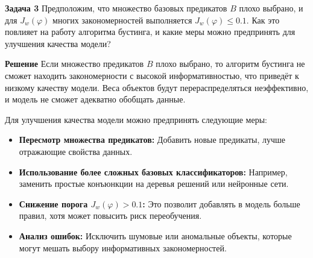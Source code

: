 \vspace{0.5cm}

\textbf{Задача 3}  
Предположим, что множество базовых предикатов \( B \) плохо выбрано, и для \( J_w(\varphi) \) многих закономерностей выполняется \( J_w(\varphi) \leq 0.1 \). Как это повлияет на работу алгоритма бустинга, и какие меры можно предпринять для улучшения качества модели?  

\textbf{Решение}  
Если множество предикатов \( B \) плохо выбрано, то алгоритм бустинга не сможет находить закономерности с высокой информативностью, что приведёт к низкому качеству модели. Веса объектов будут перераспределяться неэффективно, и модель не сможет адекватно обобщать данные.  

Для улучшения качества модели можно предпринять следующие меры:
\begin{itemize}
    \item \textbf{Пересмотр множества предикатов:} Добавить новые предикаты, лучше отражающие свойства данных.  
    \item \textbf{Использование более сложных базовых классификаторов:} Например, заменить простые конъюнкции на деревья решений или нейронные сети.  
    \item \textbf{Снижение порога \( J_w(\varphi) > 0.1 \):} Это позволит добавлять в модель больше правил, хотя может повысить риск переобучения.  
    \item \textbf{Анализ ошибок:} Исключить шумовые или аномальные объекты, которые могут мешать выбору информативных закономерностей.
\end{itemize}
